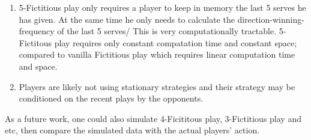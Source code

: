 \documentclass[11pt]{article}
\begin{document}
\begin{enumerate}
\item 5-Fictitious play only requires a player to keep in memory the last 5 serves he has given. At the same time he only needs to calculate the direction-winning-frequency of the last 5 serves/ This is very computationally tractable. 5-Fictitous play requires only constant compatation time and constant space; compared to vanilla Fictitious play which requires linear computation time and space.
\item Players are likely not using stationary strategies and their strategy may be conditioned on the recent plays by the opponents. 
\end{enumerate}

As a future work, one could also simulate 4-Ficititous play, 3-Fictitious play and etc, then compare the simulated data with the actual players' action. 
\end{document}
